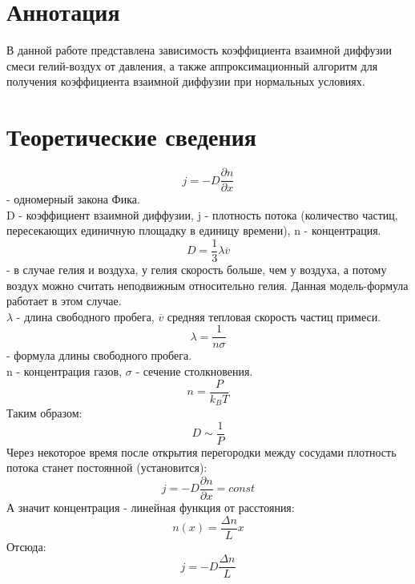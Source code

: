 \documentclass[1 pt]{article}
\begin{document}
\section{Аннотация}
В данной работе представлена зависимость коэффициента взаимной диффузии смеси гелий-воздух от давления, а также аппроксимационный алгоритм для получения коэффициента взаимной диффузии при нормальных условиях.
\section{Теоретические сведения}
\begin{equation}
    j = -D \frac{\partial n}{\partial x} 
\end{equation}
 - одномерный закона Фика. \\
 D - коэффициент взаимной диффузии, j - плотность потока (количество частиц, пересекающих единичную площадку в единицу времени), n - концентрация.
\begin{equation}
    D = \frac{1}{3} \lambda \overline{v}
\end{equation}
 - в случае гелия и воздуха, у гелия скорость больше, чем у воздуха, а потому воздух можно считать неподвижным относительно гелия. Данная модель-формула работает в этом случае. \\
$\lambda$ - длина свободного пробега, $\overline{v}$ средняя тепловая скорость частиц примеси.
\begin{equation*}
    \lambda = \frac{1}{n \sigma}
\end{equation*}
 - формула длины свободного пробега. \\
 n - концентрация газов, $\sigma$ - сечение столкновения.
\begin{equation*}
    n = \frac{P}{k_B T}
\end{equation*}
Таким образом:
\begin{equation*}
    D \sim \frac{1}{P}
\end{equation*}
Через некоторое время после открытия перегородки между сосудами плотность потока станет постоянной (установится):
\begin{equation*}
    j = -D \frac{\partial n}{\partial x} = const
\end{equation*}
А значит концентрация - линейная функция от расстояния:
\begin{equation*}
    n(x) = \frac{\Delta n}{L} x
\end{equation*}
Отсюда:
\begin{equation*}
    j = -D \frac{\Delta n}{L}
\end{equation*}
\end{document}
